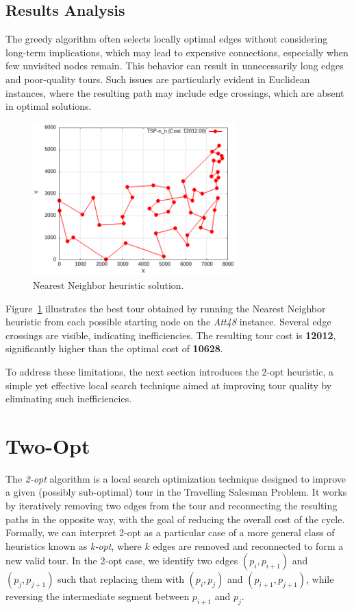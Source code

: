\subsection{Results Analysis}
\label{sec:nn-analysis}
The greedy algorithm often selects locally optimal edges without considering long-term implications, which may lead to expensive connections, 
especially when few unvisited nodes remain. This behavior can result in unnecessarily long edges and poor-quality tours. Such issues are particularly 
evident in Euclidean instances, where the resulting path may include edge crossings, which are absent in optimal solutions.

\begin{figure}[h!]
    \centering
    \includegraphics[width=0.7\textwidth]{images/TSP_n_n.png}
    \caption{Nearest Neighbor heuristic solution.}
    \label{fig:nn-example}
\end{figure}

Figure~\ref{fig:nn-example} illustrates the best tour obtained by running the Nearest Neighbor heuristic from each possible starting node on the \textit{Att48} instance. Several edge crossings are visible, indicating inefficiencies. The resulting tour cost is \textbf{12012}, significantly higher than the optimal cost of \textbf{10628}.

To address these limitations, the next section introduces the 2-opt heuristic, a simple yet effective local search technique aimed at improving tour quality by eliminating such inefficiencies.

\section{Two-Opt}
\label{sec:2opt}

The \textit{2-opt} algorithm is a local search optimization technique designed to improve a given (possibly sub-optimal) tour 
in the Travelling Salesman Problem. It works by iteratively removing two edges from the tour and reconnecting the resulting paths 
in the opposite way, with the goal of reducing the overall cost of the cycle.
Formally, we can interpret 2-opt as a particular case of a more general class of heuristics known as \textit{k-opt}, 
where $k$ edges are removed and reconnected to form a new valid tour. In the 2-opt case, we identify two edges $(p_i, p_{i+1})$ 
and $(p_j, p_{j+1})$ such that replacing them with $(p_i, p_j)$ and $(p_{i+1}, p_{j+1})$, while reversing the intermediate segment between $p_{i+1}$ and $p_j$. 

